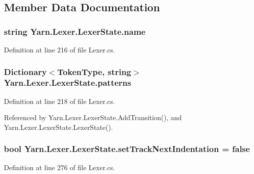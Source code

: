 \subsection{Member Data Documentation}
\hypertarget{a00128_aeb8debd0d81a76e90f083f0bf407573e}{
\subsubsection[{name}]{\setlength{\rightskip}{0pt plus 5cm}string Yarn.\-Lexer.\-Lexer\-State.\-name}}\label{a00128_aeb8debd0d81a76e90f083f0bf407573e}


Definition at line 216 of file Lexer.\-cs.

\hypertarget{a00128_a951f91e9522ffe84851f2e25e9445106}{
\subsubsection[{patterns}]{\setlength{\rightskip}{0pt plus 5cm}Dictionary$<${\bf Token\-Type}, string$>$ Yarn.\-Lexer.\-Lexer\-State.\-patterns\hspace{0.3cm}{\ttfamily [private]}}}\label{a00128_a951f91e9522ffe84851f2e25e9445106}


Definition at line 218 of file Lexer.\-cs.



Referenced by Yarn.\-Lexer.\-Lexer\-State.\-Add\-Transition(), and Yarn.\-Lexer.\-Lexer\-State.\-Lexer\-State().

\hypertarget{a00128_ad8b6ccac53bedd9dc202ffe6ac5698b2}{
\subsubsection[{set\-Track\-Next\-Indentation}]{\setlength{\rightskip}{0pt plus 5cm}bool Yarn.\-Lexer.\-Lexer\-State.\-set\-Track\-Next\-Indentation = false}}\label{a00128_ad8b6ccac53bedd9dc202ffe6ac5698b2}


Definition at line 276 of file Lexer.\-cs.



